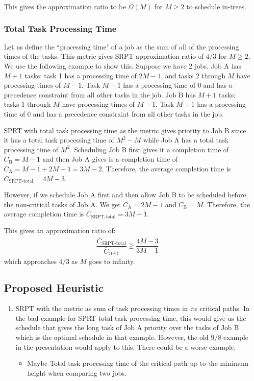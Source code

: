 This gives the approximation ratio to be $\Omega(M)$ for $M\geq 2$ to schedule in-trees.

\subsubsection{Total Task Processing Time}

Let us define the ``processing time" of a job as the sum of all of the processing times of the tasks.  This metric gives SRPT approximation ratio of $4/3$ for $M\geq 2$.
We use the following example to show this.
Suppose we have 2 jobs.
Job A has $M+1$ tasks: task 1 has a processing time of $2M-1$, and tasks $2$ through $M$ have processing times of $M-1$.
Task $M+1$ has a processing time of 0 and has a precedence constraint from all other tasks in the job.
Job B has $M+1$ tasks: tasks 1 through $M$ have processing times of $M-1$.
Task $M+1$ has a processing time of 0 and has a precedence constraint from all other tasks in the job. 

SPRT with total task processing time as the metric gives priority to Job B since it has a total task processing time of $M^2-M$ while Job A has a total task processing time of $M^2$.
Scheduling Job B first gives it a completion time of $C_\text{B}=M-1$ and then Job A gives is a completion time of $C_\text{A}=M-1+2M-1=3M-2$.  Therefore, the average completion time is $\overline{C}_\text{SRPT-total}=4M-3$.

However, if we schedule Job A first and then allow Job B to be scheduled before the non-critical tasks of Job A.  We get  $C_\text{A}=2M-1$ and $C_\text{B}=M$.
Therefore, the average completion time is $\overline{C}_\text{SRPT-total}=3M-1$.

This gives an approximation ratio of:
\begin{align}
	\dfrac{\overline{C}_\text{SRPT-total}}{\overline{C}_\text{OPT}} \geq \dfrac{4M-3}{3M-1}
\end{align}
which approaches $4/3$ as $M$ goes to infinity.

\subsection{Proposed Heuristic}

\begin{enumerate}
	\item SRPT with the metric as sum of task processing times in its critical paths.
	In the bad example for SPRT total task processing time, this would give us the schedule that gives the long task of Job A priority over the tasks of Job B which is the optimal schedule in that example.
	However, the old $9/8$ example in the presentation would apply to this.
	There could be a worse example.
	\begin{itemize}
		\item Maybe Total task processing time of the critical path up to the minimum height when comparing two jobs.
	\end{itemize}
\end{enumerate}